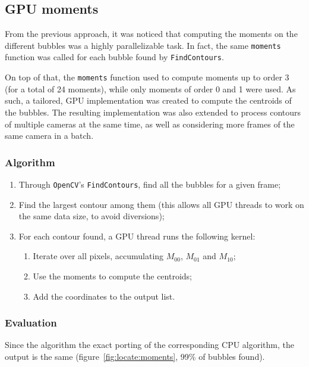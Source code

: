 \subsection{GPU moments}

From the previous approach, it was noticed that computing the moments on the different bubbles was a highly parallelizable task.
In fact, the same \texttt{moments} function was called for each bubble found by \texttt{FindContours}.

On top of that, the \texttt{moments} function used to compute moments up to order 3 (for a total of 24 moments), while only moments of order 0 and 1 were used.
As such, a tailored, GPU implementation was created to compute the centroids of the bubbles.
The resulting implementation was also extended to process contours of multiple cameras at the same time,  as well as considering more frames of the same camera in a batch.

\subsubsection{Algorithm}

\begin{enumerate}
	\itemsep 0em
	\item Through \texttt{OpenCV}'s \texttt{FindContours}, find all the bubbles for a given frame;
	\item Find the largest contour among them (this allows all GPU threads to work on the same data size, to avoid diversions);
	\item For each contour found, a GPU thread runs the following kernel:
	      \begin{enumerate}
		      \item Iterate over all pixels, accumulating $M_{00}$, $M_{01}$ and $M_{10}$;
		      \item Use the moments to compute the centroids;
		      \item Add the coordinates to the output list.
	      \end{enumerate}
\end{enumerate}

\subsubsection{Evaluation}

Since the algorithm the exact porting of the corresponding CPU algorithm, the output is the same (figure~\ref{fig:locate:moments}, 99\% of bubbles found).

